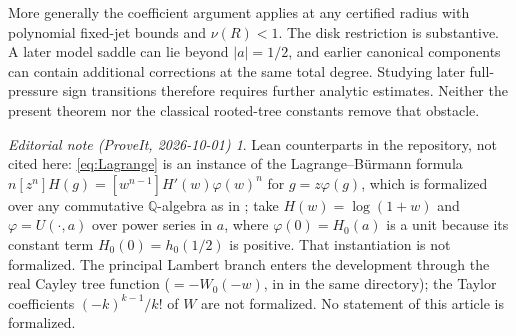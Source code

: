 \documentclass[11pt,a4paper]{article}
\theoremstyle{remark}\newtheorem*{ednote}{Editorial note (ProveIt, 2026-10-01)}
\begin{document}
More generally the coefficient argument applies at any certified radius with polynomial fixed-jet bounds and $\nu(R)<1$. The disk restriction is substantive. A later model saddle can lie beyond $|a|=1/2$, and earlier canonical components can contain additional corrections at the same total degree. Studying later full-pressure sign transitions therefore requires further analytic estimates. Neither the present theorem nor the classical rooted-tree constants remove that obstacle.
\begin{ednote}
Lean counterparts in the repository, not cited here: \eqref{eq:Lagrange} is an instance of the
Lagrange--B\"urmann formula $n[z^n]H(g)=[w^{n-1}]H'(w)\varphi(w)^n$ for $g=z\varphi(g)$, which
is formalized over any commutative $\mathbb Q$-algebra as
 in
; take
$H(w)=\log(1+w)$ and $\varphi=U(\cdot,a)$ over power series in $a$, where
$\varphi(0)=H_0(a)$ is a unit because its constant term $H_0(0)=h_0(1/2)$ is positive. That instantiation is not formalized.
The principal Lambert branch enters the development through the real Cayley tree function
 ($=-W_0(-w)$, in  in the same
directory); the Taylor coefficients $(-k)^{k-1}/k!$ of $W$ are not formalized. No statement of
this article is formalized.
\end{ednote}
\end{document}
